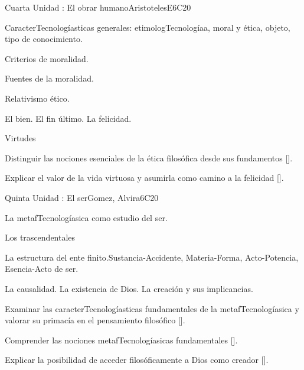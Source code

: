 \begin{syllabus}
\begin{unit}{}{Cuarta Unidad : El obrar humano}{AristotelesE}{6}{C20}
\begin{topics}
	\item CaracterTecnologíasticas generales: etimologTecnologíaa, moral y ética, objeto, tipo de conocimiento.
	\item Criterios de moralidad.
	\item Fuentes de la moralidad.
	\item Relativismo ético.
	\item El bien. El fin último. La felicidad.
	\item Virtudes
\end{topics}
\begin{learningoutcomes}
	\item Distinguir las nociones esenciales de la ética filosófica desde sus fundamentos [\Usage].
    \item Explicar el valor de la vida virtuosa y asumirla como camino a la felicidad [\Usage].
\end{learningoutcomes}
\end{unit}

\begin{unit}{}{Quinta Unidad : El ser}{Gomez, Alvira}{6}{C20}
\begin{topics}
	\item La metafTecnologíasica como estudio del ser.
	\item Los trascendentales
	\item La estructura del ente finito.Sustancia-Accidente, Materia-Forma, Acto-Potencia, Esencia-Acto de ser.
	\item La causalidad. La existencia de Dios. La creación y sus implicancias.
\end{topics}
\begin{learningoutcomes}
	\item Examinar las caracterTecnologíasticas fundamentales de la metafTecnologíasica y valorar su primacía en el pensamiento filosófico [\Usage].
    \item Comprender las nociones metafTecnologíasicas fundamentales [\Usage].
    \item Explicar la posibilidad de acceder filosóficamente a Dios como creador [\Usage].
\end{learningoutcomes}
\end{unit}



\begin{coursebibliography}
\end{coursebibliography}

\end{syllabus}
